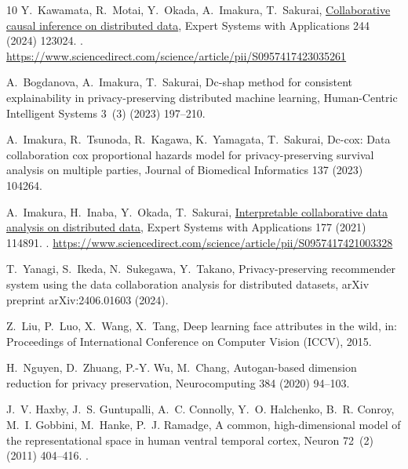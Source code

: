 \documentclass[final,3p,times]{elsarticle}
\theoremstyle{plain}
\begin{document}
\begin{thebibliography}{10}
Y.~Kawamata, R.~Motai, Y.~Okada, A.~Imakura, T.~Sakurai, \href{https://www.sciencedirect.com/science/article/pii/S0957417423035261}{Collaborative causal inference on distributed data}, Expert Systems with Applications 244 (2024) 123024.
\newblock \href {https://doi.org/https://doi.org/10.1016/j.eswa.2023.123024} {}.
\newline\urlprefix\url{https://www.sciencedirect.com/science/article/pii/S0957417423035261}

A.~Bogdanova, A.~Imakura, T.~Sakurai, Dc-shap method for consistent explainability in privacy-preserving distributed machine learning, Human-Centric Intelligent Systems 3~(3) (2023) 197--210.

A.~Imakura, R.~Tsunoda, R.~Kagawa, K.~Yamagata, T.~Sakurai, Dc-cox: Data collaboration cox proportional hazards model for privacy-preserving survival analysis on multiple parties, Journal of Biomedical Informatics 137 (2023) 104264.

A.~Imakura, H.~Inaba, Y.~Okada, T.~Sakurai, \href{https://www.sciencedirect.com/science/article/pii/S0957417421003328}{Interpretable collaborative data analysis on distributed data}, Expert Systems with Applications 177 (2021) 114891.
\newblock \href {https://doi.org/https://doi.org/10.1016/j.eswa.2021.114891} {}.
\newline\urlprefix\url{https://www.sciencedirect.com/science/article/pii/S0957417421003328}

T.~Yanagi, S.~Ikeda, N.~Sukegawa, Y.~Takano, Privacy-preserving recommender system using the data collaboration analysis for distributed datasets, arXiv preprint arXiv:2406.01603 (2024).

Z.~Liu, P.~Luo, X.~Wang, X.~Tang, Deep learning face attributes in the wild, in: Proceedings of International Conference on Computer Vision (ICCV), 2015.

H.~Nguyen, D.~Zhuang, P.-Y. Wu, M.~Chang, Autogan-based dimension reduction for privacy preservation, Neurocomputing 384 (2020) 94--103.

J.~V. Haxby, J.~S. Guntupalli, A.~C. Connolly, Y.~O. Halchenko, B.~R. Conroy, M.~I. Gobbini, M.~Hanke, P.~J. Ramadge, A common, high-dimensional model of the representational space in human ventral temporal cortex, Neuron 72~(2) (2011) 404--416.
\newblock \href {https://doi.org/10.1016/j.neuron.2011.08.026} {}.


\end{thebibliography}
\end{document}
